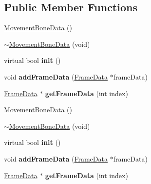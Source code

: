 \subsection*{Public Member Functions}
\begin{DoxyCompactItemize}
\item 
\hyperlink{classcocostudio_1_1MovementBoneData_a6f321d770c2308d720a1c8781114d028}{Movement\+Bone\+Data} ()
\item 
\hyperlink{classcocostudio_1_1MovementBoneData_a7b02d7bc0a1e8bc596cf4f94c70076aa}{$\sim$\+Movement\+Bone\+Data} (void)
\item 
\mbox{\label{classcocostudio_1_1MovementBoneData_afd20b501baf1b66fe118906d2ddd8c83}} 
virtual bool {\bfseries init} ()
\item 
\mbox{\label{classcocostudio_1_1MovementBoneData_a508be25ef851ec45e3f741b1a67bddcc}} 
void {\bfseries add\+Frame\+Data} (\hyperlink{classcocostudio_1_1FrameData}{Frame\+Data} $\ast$frame\+Data)
\item 
\mbox{\label{classcocostudio_1_1MovementBoneData_adace4d027bb5bac64e2cfb5027b1cff7}} 
\hyperlink{classcocostudio_1_1FrameData}{Frame\+Data} $\ast$ {\bfseries get\+Frame\+Data} (int index)
\item 
\hyperlink{classcocostudio_1_1MovementBoneData_a6f321d770c2308d720a1c8781114d028}{Movement\+Bone\+Data} ()
\item 
\hyperlink{classcocostudio_1_1MovementBoneData_a7b02d7bc0a1e8bc596cf4f94c70076aa}{$\sim$\+Movement\+Bone\+Data} (void)
\item 
\mbox{\label{classcocostudio_1_1MovementBoneData_af59b01233dbe21089c5d830fe3e4f77c}} 
virtual bool {\bfseries init} ()
\item 
\mbox{\label{classcocostudio_1_1MovementBoneData_a508be25ef851ec45e3f741b1a67bddcc}} 
void {\bfseries add\+Frame\+Data} (\hyperlink{classcocostudio_1_1FrameData}{Frame\+Data} $\ast$frame\+Data)
\item 
\mbox{\label{classcocostudio_1_1MovementBoneData_af10e5c71b353c9d94ac2861741b370b8}} 
\hyperlink{classcocostudio_1_1FrameData}{Frame\+Data} $\ast$ {\bfseries get\+Frame\+Data} (int index)
\end{DoxyCompactItemize}
